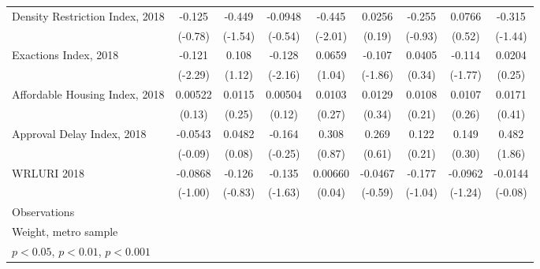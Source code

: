 \begin{table}[htbp]
\begin{tabular}{l*{8}{c}}
\addlinespace
Density Restriction Index, 2018&      -0.125         &      -0.449         &     -0.0948         &      -0.445\sym{*}  &      0.0256         &      -0.255         &      0.0766         &      -0.315         \\
                    &     (-0.78)         &     (-1.54)         &     (-0.54)         &     (-2.01)         &      (0.19)         &     (-0.93)         &      (0.52)         &     (-1.44)         \\
\addlinespace
Exactions Index, 2018&      -0.121\sym{*}  &       0.108         &      -0.128\sym{*}  &      0.0659         &      -0.107         &      0.0405         &      -0.114         &      0.0204         \\
                    &     (-2.29)         &      (1.12)         &     (-2.16)         &      (1.04)         &     (-1.86)         &      (0.34)         &     (-1.77)         &      (0.25)         \\
\addlinespace
Affordable Housing Index, 2018&     0.00522         &      0.0115         &     0.00504         &      0.0103         &      0.0129         &      0.0108         &      0.0107         &      0.0171         \\
                    &      (0.13)         &      (0.25)         &      (0.12)         &      (0.27)         &      (0.34)         &      (0.21)         &      (0.26)         &      (0.41)         \\
\addlinespace
Approval Delay Index, 2018&     -0.0543         &      0.0482         &      -0.164         &       0.308         &       0.269         &       0.122         &       0.149         &       0.482         \\
                    &     (-0.09)         &      (0.08)         &     (-0.25)         &      (0.87)         &      (0.61)         &      (0.21)         &      (0.30)         &      (1.86)         \\
\addlinespace
WRLURI 2018         &     -0.0868         &      -0.126         &      -0.135         &     0.00660         &     -0.0467         &      -0.177         &     -0.0962         &     -0.0144         \\
                    &     (-1.00)         &     (-0.83)         &     (-1.63)         &      (0.04)         &     (-0.59)         &     (-1.04)         &     (-1.24)         &     (-0.08)         \\
\midrule
Observations        &                     &                     &                     &                     &                     &                     &                     &                     \\
\bottomrule
\multicolumn{9}{l}{\footnotesize Weight, metro sample}\\
\multicolumn{9}{l}{\footnotesize \sym{*} \(p<0.05\), \sym{**} \(p<0.01\), \sym{***} \(p<0.001\)}\\
\end{tabular}
\end{table}
